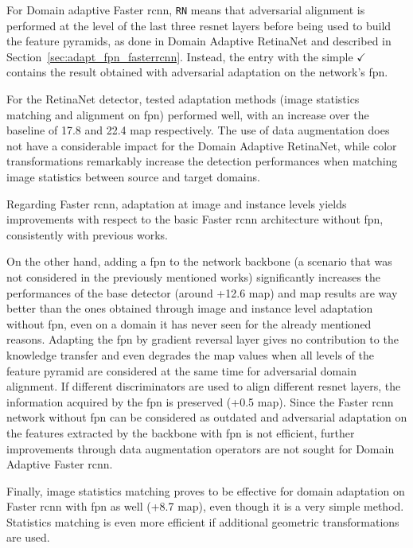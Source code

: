 \documentclass[%
    corpo=12pt,
    twoside,
    stile=classica,   
    tipotesi=magistrale,
    evenboxes,
    english,
	numerazioneromana,
]{toptesi}
\begin{document}
For Domain adaptive Faster \gls{rcnn}, \texttt{RN} means that adversarial alignment is performed at the level of the last three \gls{resnet} layers before being used to build the feature pyramids, as done in Domain Adaptive RetinaNet\cite{pasqualino2020unsupervised} and described in Section~\ref{sec:adapt_fpn_fasterrcnn}. Instead, the entry with the simple $\checkmark$ contains the result obtained with adversarial adaptation on the network's \gls{fpn}.

\bigskip
For the RetinaNet detector, tested adaptation methods (image statistics matching and alignment on \gls{fpn}) performed well, with an increase over the baseline of 17.8 and 22.4 \gls{map} respectively. The use of data augmentation does not have a considerable impact for the Domain Adaptive RetinaNet, while color transformations remarkably increase the detection performances when matching image statistics between source and target domains.

\bigskip
Regarding Faster \gls{rcnn}, adaptation at image and instance levels yields improvements with respect to the basic Faster \gls{rcnn} architecture without \gls{fpn}, consistently with previous works\cite{abramov2020simple}\cite{chen2018domain}\cite{saito2019strongweak}.

\medskip
On the other hand, adding a \gls{fpn} to the network backbone (a scenario that was not considered in the previously mentioned works) significantly increases the performances of the base detector (around +12.6 \acrshort{map}) and \gls{map} results are way better than the ones obtained through image and instance level adaptation without \gls{fpn}, even on a domain it has never seen for the already mentioned reasons. Adapting the \gls{fpn} by gradient reversal layer gives no contribution to the knowledge transfer and even degrades the \gls{map} values when all levels of the feature pyramid are considered at the same time for adversarial domain alignment. If different discriminators are used to align different \gls{resnet} layers, the information acquired by the \gls{fpn} is preserved (+0.5 \gls{map}). Since the Faster \gls{rcnn} network without \gls{fpn} can be considered as outdated and adversarial adaptation on the features extracted by the backbone with \gls{fpn} is not efficient, further improvements through data augmentation operators are not sought for Domain Adaptive Faster \gls{rcnn}.

\medskip
Finally, image statistics matching proves to be effective for domain adaptation on Faster \gls{rcnn} with \gls{fpn} as well (+8.7 \gls{map}), even though it is a very simple method. Statistics matching is even more efficient if additional geometric transformations are used.
\end{document}
